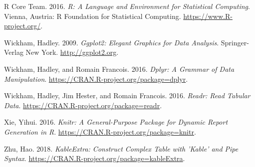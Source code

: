 \documentclass[]{article}
\begin{document}
\hypertarget{ref-baseR}{}
R Core Team. 2016. \emph{R: A Language and Environment for Statistical
Computing}. Vienna, Austria: R Foundation for Statistical Computing.
\url{https://www.R-project.org/}.

\hypertarget{ref-ggplot2}{}
Wickham, Hadley. 2009. \emph{Ggplot2: Elegant Graphics for Data
Analysis}. Springer-Verlag New York. \url{http://ggplot2.org}.

\hypertarget{ref-dplyr}{}
Wickham, Hadley, and Romain Francois. 2016. \emph{Dplyr: A Grammar of
Data Manipulation}. \url{https://CRAN.R-project.org/package=dplyr}.

\hypertarget{ref-readr}{}
Wickham, Hadley, Jim Hester, and Romain Francois. 2016. \emph{Readr:
Read Tabular Data}. \url{https://CRAN.R-project.org/package=readr}.

\hypertarget{ref-knitr}{}
Xie, Yihui. 2016. \emph{Knitr: A General-Purpose Package for Dynamic
Report Generation in R}. \url{https://CRAN.R-project.org/package=knitr}.

\hypertarget{ref-kableExtra}{}
Zhu, Hao. 2018. \emph{KableExtra: Construct Complex Table with 'Kable'
and Pipe Syntax}. \url{https://CRAN.R-project.org/package=kableExtra}.
\end{document}
